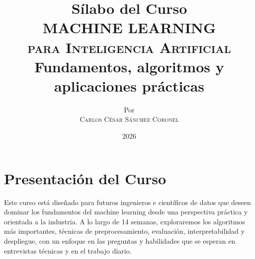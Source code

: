 \documentclass[12pt,a4paper,openany,oneside]{book}
\title{
    \textbf{Sílabo del Curso} \\ 
    \Huge \textbf{MACHINE LEARNING} \\
    \Large \textsc{para Inteligencia Artificial} \\[1cm]
    \normalsize Fundamentos, algoritmos y aplicaciones prácticas
}
\author{
    \small Por \\ \vspace{0.2cm}
    \Large \textsc{Carlos César Sánchez Coronel}
}
\date{2026}
\begin{document}
\maketitle
\tableofcontents

\chapter*{Presentación del Curso}

Este curso está diseñado para futuros ingenieros e científicos de datos que deseen dominar los fundamentos del machine learning desde una perspectiva práctica y orientada a la industria. A lo largo de 14 semanas, exploraremos los algoritmos más importantes, técnicas de preprocesamiento, evaluación, interpretabilidad y despliegue, con un enfoque en las preguntas y habilidades que se esperan en entrevistas técnicas y en el trabajo diario.
\end{document}

